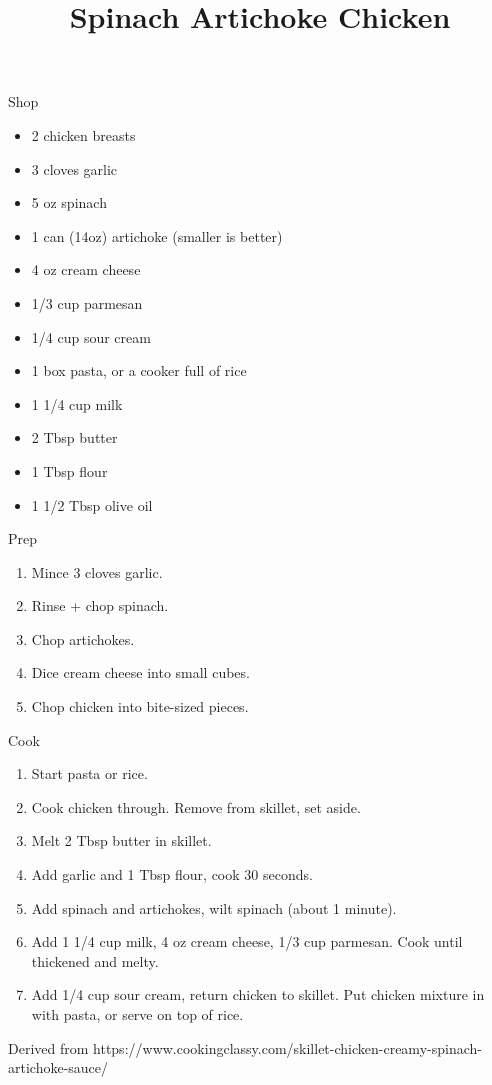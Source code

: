 \documentclass{article}
\title{Spinach Artichoke Chicken}
\date{\vspace{-5ex}}
\begin{document}
\maketitle

Shop

\begin{itemize}
	\item 2 chicken breasts
	\item 3 cloves garlic
	\item 5 oz spinach
	\item 1 can (14oz) artichoke (smaller is better)
	\item 4 oz cream cheese
	\item 1/3 cup parmesan
	\item 1/4 cup sour cream
	\item 1 box pasta, or a cooker full of rice
	\item 1 1/4 cup milk
        \item 2 Tbsp butter
	\item 1 Tbsp flour
	\item 1 1/2 Tbsp olive oil
\end{itemize}

Prep

\begin{enumerate}
	\item Mince 3 cloves garlic.
	\item Rinse + chop spinach.
	\item Chop artichokes.
	\item Dice cream cheese into small cubes.
	\item Chop chicken into bite-sized pieces.
\end{enumerate}

Cook

\begin{enumerate}
	\item Start pasta or rice.
	\item Cook chicken through. Remove from skillet, set aside.
	\item Melt 2 Tbsp butter in skillet.
	\item Add garlic and 1 Tbsp flour, cook 30 seconds.
	\item Add spinach and artichokes, wilt spinach (about 1 minute).
	\item Add 1 1/4 cup milk, 4 oz cream cheese, 1/3 cup parmesan. Cook until thickened and melty.
	\item Add 1/4 cup sour cream, return chicken to skillet. Put chicken mixture in with pasta, or serve on top of rice.
\end{enumerate}

Derived from https://www.cookingclassy.com/skillet-chicken-creamy-spinach-artichoke-sauce/
\end{document}

